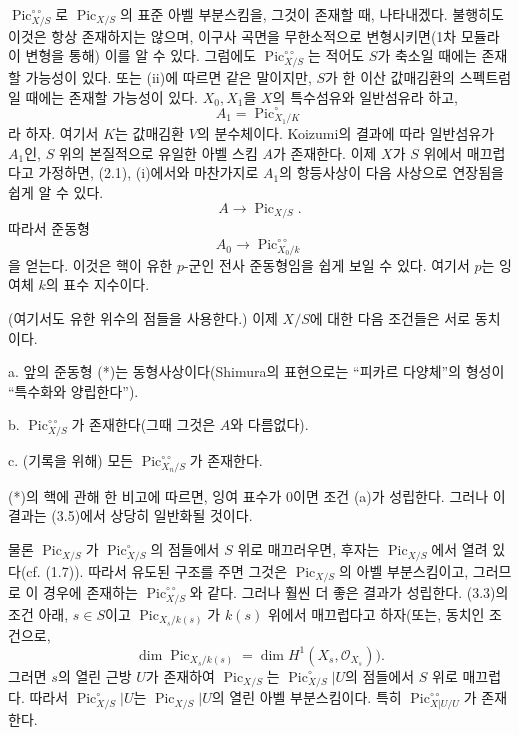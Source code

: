  $\operatorname{Pic}_{X/S}^{\circ\circ}$로
$\operatorname{Pic}_{X/S}$의 표준 아벨 부분스킴을, 그것이 존재할 때,
나타내겠다. 불행히도 이것은 항상 존재하지는 않으며, 이구사 곡면을
무한소적으로 변형시키면(1차 모듈라이 변형을 통해) 이를 알 수 있다.
그럼에도 $\operatorname{Pic}_{X/S}^{\circ\circ}$는 적어도 $S$가 축소일
때에는 존재할 가능성이 있다. 또는 (ii)에 따르면 같은 말이지만, $S$가
한 이산 값매김환의 스펙트럼일 때에는 존재할 가능성이 있다. $X_0,X_1$을
$X$의 특수섬유와 일반섬유라 하고,
\[
A_1=\operatorname{Pic}_{X_1/K}^\circ
\]
라 하자. 여기서 $K$는 값매김환 $V$의 분수체이다. Koizumi의 결과에 따라
일반섬유가 $A_1$인, $S$ 위의 본질적으로 유일한 아벨 스킴 $A$가 존재한다.
이제 $X$가 $S$ 위에서 매끄럽다고 가정하면, (2.1), (i)에서와 마찬가지로
$A_1$의 항등사상이 다음 사상으로 연장됨을 쉽게 알 수 있다.
\[
A\longrightarrow\operatorname{Pic}_{X/S}.
\]
따라서 준동형
\[
\tag{*}A_0\longrightarrow\operatorname{Pic}_{X_0/k}^{\circ\circ}
\]
을 얻는다. 이것은 핵이 유한 $p$-군인 전사 준동형임을 쉽게 보일 수 있다.
여기서 $p$는 잉여체 $k$의 표수 지수이다.

(여기서도 유한 위수의 점들을 사용한다.) 이제 $X/S$에 대한 다음 조건들은
서로 동치이다.

\medskip
\noindent a. 앞의 준동형 (*)는 동형사상이다(Shimura의 표현으로는
``피카르 다양체''의 형성이 ``특수화와 양립한다'').

\noindent b. $\operatorname{Pic}_{X/S}^{\circ\circ}$가 존재한다(그때 그것은
$A$와 다름없다).

\noindent c. (기록을 위해) 모든
$\operatorname{Pic}_{X_n/S}^{\circ\circ}$가 존재한다.

(*)의 핵에 관해 한 비고에 따르면, 잉여 표수가 0이면 조건 (a)가 성립한다.
그러나 이 결과는 (3.5)에서 상당히 일반화될 것이다.

물론 $\operatorname{Pic}_{X/S}$가 $\operatorname{Pic}_{X/S}^\circ$의
점들에서 $S$ 위로 매끄러우면, 후자는 $\operatorname{Pic}_{X/S}$에서
열려 있다(cf. (1.7)). 따라서 유도된 구조를 주면 그것은
$\operatorname{Pic}_{X/S}$의 아벨 부분스킴이고, 그러므로 이 경우에
존재하는 $\operatorname{Pic}_{X/S}^{\circ\circ}$와 같다. 그러나 훨씬
더 좋은 결과가 성립한다.
 (3.3)의 조건 아래, $s\in S$이고
$\operatorname{Pic}_{X_s/k(s)}$가 $k(s)$ 위에서 매끄럽다고 하자(또는,
동치인 조건으로,
\[
\dim\operatorname{Pic}_{X_s/k(s)}=\dim H^1(X_s,\mathcal O_{X_s})).
\]
그러면 $s$의 열린 근방 $U$가 존재하여
$\operatorname{Pic}_{X/S}$는 $\operatorname{Pic}_{X/S}^\circ|U$의
점들에서 $S$ 위로 매끄럽다. 따라서 $\operatorname{Pic}_{X/S}^\circ|U$는
$\operatorname{Pic}_{X/S}|U$의 열린 아벨 부분스킴이다. 특히
$\operatorname{Pic}_{X|U/U}^{\circ\circ}$가 존재한다.

